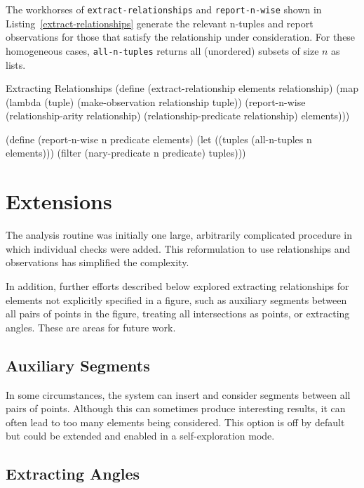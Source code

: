 The workhorses of \texttt{extract-relationships} and
\texttt{report-n-wise} shown in Listing~\ref{extract-relationships}
generate the relevant n-tuples and report observations for those that
satisfy the relationship under consideration. For these homogeneous
cases, \texttt{all-n-tuples} returns all (unordered) subsets of size
$n$ as lists.

\begin{code-listing}
[label=extract-relationships]
{Extracting Relationships}
(define (extract-relationship elements relationship)
  (map (lambda (tuple)
         (make-observation relationship tuple))
       (report-n-wise
        (relationship-arity relationship)
        (relationship-predicate relationship)
        elements)))

(define (report-n-wise n predicate elements)
  (let ((tuples (all-n-tuples n elements)))
    (filter (nary-predicate n predicate) tuples)))
\end{code-listing}

\section{Extensions}

The analysis routine was initially one large, arbitrarily complicated
procedure in which individual checks were added. This reformulation
to use relationships and observations has simplified the complexity.

In addition, further efforts described below explored extracting
relationships for elements not explicitly specified in a figure, such
as auxiliary segments between all pairs of points in the figure,
treating all intersections as points, or extracting angles. These are
areas for future work.

\subsection{Auxiliary Segments}

In some circumstances, the system can insert and consider segments
between all pairs of points. Although this can sometimes produce
interesting results, it can often lead to too many elements being
considered. This option is off by default but could be extended and
enabled in a self-exploration mode.

\subsection{Extracting Angles}

